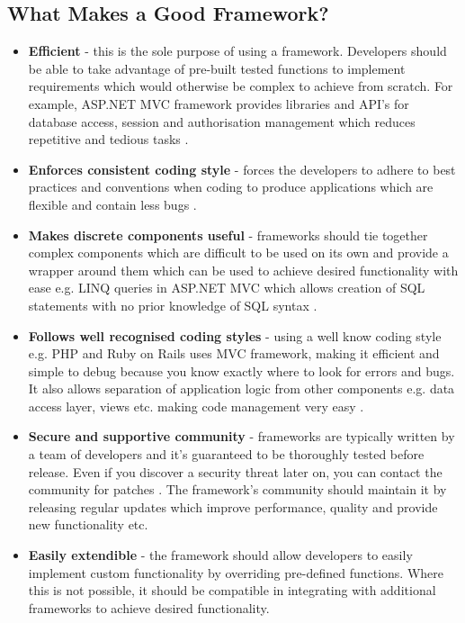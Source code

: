\subsection{What Makes a Good Framework?}
\label{subsec:what-makes-a-good-framework}

\begin{itemize}
    \item \textbf{Efficient} - this is the sole purpose of using a framework. Developers should be able to take advantage of pre-built tested functions to implement requirements which would otherwise be complex to achieve from scratch. For example, ASP.NET MVC framework provides libraries and API’s for database access, session and authorisation management which reduces repetitive and tedious tasks \cite{asp.net-team}. 
    \item \textbf{Enforces consistent coding style} - forces the developers to adhere to best practices and conventions when coding to produce applications which are flexible and contain less bugs \cite{cimetrix}.
    \item \textbf{Makes discrete components useful} - frameworks should tie together complex components which are difficult to be used on its own and provide a wrapper around them which can be used to achieve desired functionality with ease e.g. LINQ queries in ASP.NET MVC which allows creation of SQL statements with no prior knowledge of SQL syntax \cite{social-msdn}.
    \item \textbf{Follows well recognised coding styles} - using a well know coding style e.g. PHP and Ruby on Rails uses MVC framework, making it efficient and simple to debug because you know exactly where to look for errors and bugs. It also allows separation of application logic from other components e.g. data access layer, views etc. making code management very easy \cite{speckyboy}.
	\item \textbf{Secure and supportive community} - frameworks are typically written by a team of developers and it’s guaranteed to be thoroughly tested before release. Even if you discover a security threat later on, you can contact the community for patches \cite{OSTraining}. The framework’s community should maintain it by releasing regular updates which improve performance, quality and provide new functionality etc. \cite{cimetrix}
	\item \textbf{Easily extendible} - the framework should allow developers to easily implement custom functionality by overriding pre-defined functions. Where this is not possible, it should be compatible in integrating with additional frameworks to achieve desired functionality. \\ 
\end{itemize}

